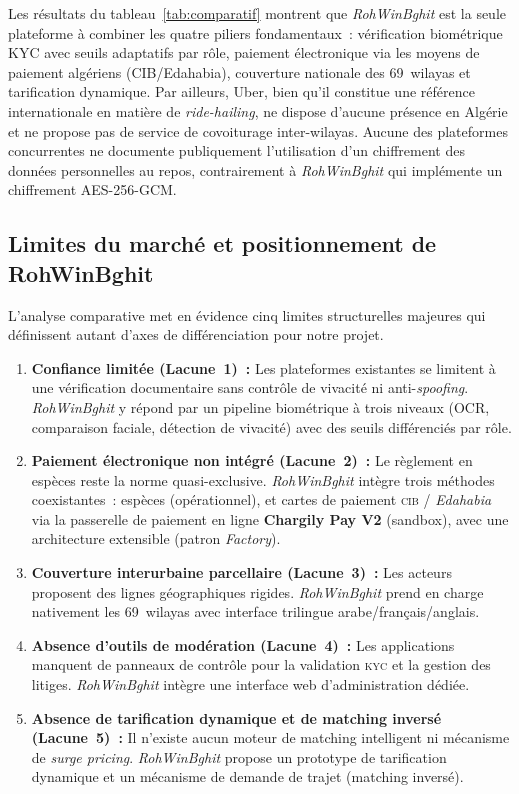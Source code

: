 \begin{landscape}
Les résultats du tableau~\ref{tab:comparatif} montrent que \textit{RohWinBghit} est la seule plateforme à combiner les quatre piliers fondamentaux~: vérification biométrique KYC avec seuils adaptatifs par rôle, paiement électronique via les moyens de paiement algériens (CIB/Edahabia), couverture nationale des 69~wilayas et tarification dynamique. Par ailleurs, Uber, bien qu'il constitue une référence internationale en matière de \textit{ride-hailing}, ne dispose d'aucune présence en Algérie et ne propose pas de service de covoiturage inter-wilayas. Aucune des plateformes concurrentes ne documente publiquement l'utilisation d'un chiffrement des données personnelles au repos, contrairement à \textit{RohWinBghit} qui implémente un chiffrement AES-256-GCM.
\end{landscape}

\subsection{Limites du marché et positionnement de RohWinBghit}
\label{sec:limites}

L'analyse comparative met en évidence cinq limites structurelles majeures qui définissent autant d'axes de différenciation pour notre projet.

\begin{enumerate}[leftmargin=1.8em]
  \item \textbf{Confiance limitée (Lacune~1)~:} Les plateformes existantes se limitent à une vérification documentaire sans contrôle de vivacité ni anti-\textit{spoofing}. \textit{RohWinBghit} y répond par un pipeline biométrique à trois niveaux (OCR, comparaison faciale, détection de vivacité) avec des seuils différenciés par rôle.
  \item \textbf{Paiement électronique non intégré (Lacune~2)~:} Le règlement en espèces reste la norme quasi-exclusive. \textit{RohWinBghit} intègre trois méthodes coexistantes~: espèces (opérationnel), et cartes de paiement \textsc{cib} / \textit{Edahabia} via la passerelle de paiement en ligne \textbf{Chargily Pay V2} (sandbox), avec une architecture extensible (patron \textit{Factory}).
  \item \textbf{Couverture interurbaine parcellaire (Lacune~3)~:} Les acteurs proposent des lignes géographiques rigides. \textit{RohWinBghit} prend en charge nativement les 69~wilayas avec interface trilingue arabe/français/anglais.
  \item \textbf{Absence d'outils de modération (Lacune~4)~:} Les applications manquent de panneaux de contrôle pour la validation \textsc{kyc} et la gestion des litiges. \textit{RohWinBghit} intègre une interface web d'administration dédiée.
  \item \textbf{Absence de tarification dynamique et de matching inversé (Lacune~5)~:} Il n'existe aucun moteur de matching intelligent ni mécanisme de \textit{surge pricing}. \textit{RohWinBghit} propose un prototype de tarification dynamique et un mécanisme de demande de trajet (matching inversé).
\end{enumerate}

